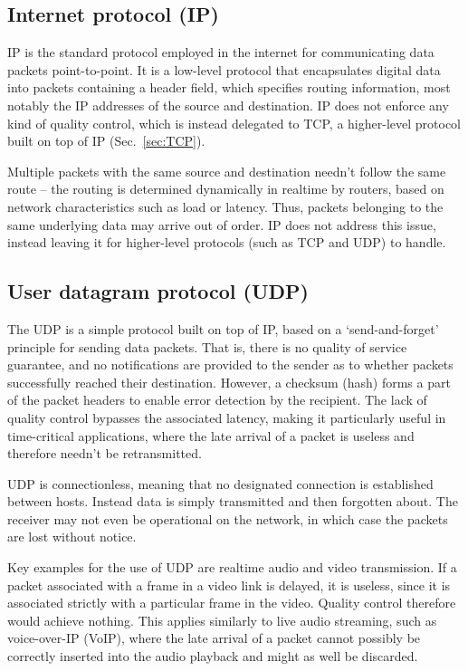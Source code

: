 \documentclass[aps,rmp,twocolumn,amsmath,amssymb,nofootinbib,superscriptaddress]{revtex4}
\begin{document}
%
%

\subsection{Internet protocol (IP)}

IP is the standard protocol employed in the internet for communicating data packets point-to-point. It is a low-level protocol that encapsulates digital data into packets containing a header field, which specifies routing information, most notably the IP addresses of the source and destination. IP does not enforce any kind of quality control, which is instead delegated to TCP, a higher-level protocol built on top of IP (Sec.~\ref{sec:TCP}).

Multiple packets with the same source and destination needn't follow the same route -- the routing is determined dynamically in realtime by routers, based on network characteristics such as load or latency. Thus, packets belonging to the same underlying data may arrive out of order. IP does not address this issue, instead leaving it for higher-level protocols (such as TCP and UDP) to handle.

%
%

\subsection{User datagram protocol (UDP)}

The UDP is a simple protocol built on top of IP, based on a `send-and-forget' principle for sending data packets. That is, there is no quality of service guarantee, and no notifications are provided to the sender as to whether packets successfully reached their destination. However, a checksum (hash) forms a part of the packet headers to enable error detection by the recipient. The lack of quality control bypasses the associated latency, making it particularly useful in time-critical applications, where the late arrival of a packet is useless and therefore needn't be retransmitted.

UDP is connectionless, meaning that no designated connection is established between hosts. Instead data is simply transmitted and then forgotten about. The receiver may not even be operational on the network, in which case the packets are lost without notice.

Key examples for the use of UDP are realtime audio and video transmission. If a packet associated with a frame in a video link is delayed, it is useless, since it is associated strictly with a particular frame in the video. Quality control therefore would achieve nothing. This applies similarly to live audio streaming, such as voice-over-IP (VoIP), where the late arrival of a packet cannot possibly be correctly inserted into the audio playback and might as well be discarded.
\end{document}
